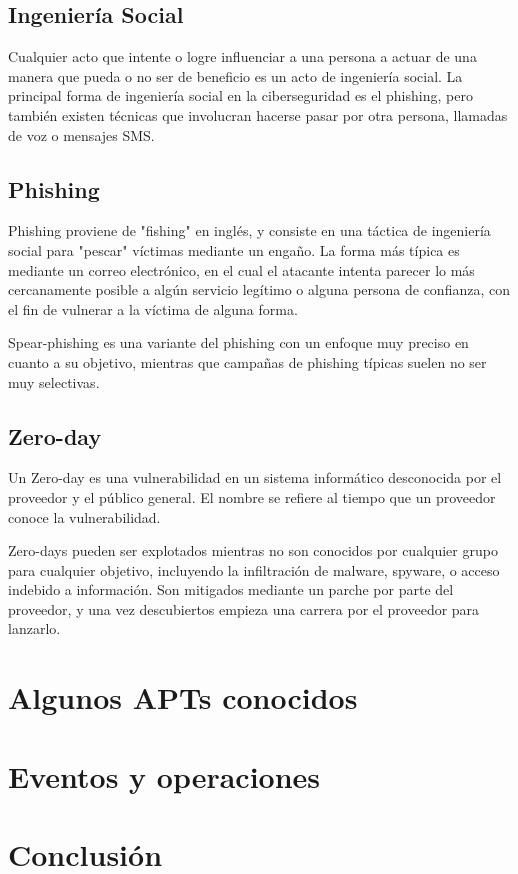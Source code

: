 \documentclass{article}
\begin{document}
\subsection{Ingeniería Social}
Cualquier acto que intente o logre influenciar a una persona a actuar de una manera que pueda o no ser de beneficio es un acto de ingeniería social. La principal forma de ingeniería social en la ciberseguridad es el phishing, pero también existen técnicas que involucran hacerse pasar por otra persona, llamadas de voz o mensajes SMS.

\subsection{Phishing}
Phishing proviene de "fishing" en inglés, y consiste en una táctica de ingeniería social para "pescar" víctimas mediante un engaño. La forma más típica es mediante un correo electrónico, en el cual el atacante intenta parecer lo más cercanamente posible a algún servicio legítimo o alguna persona de confianza, con el fin de vulnerar a la víctima de alguna forma.

Spear-phishing es una variante del phishing con un enfoque muy preciso en cuanto a su objetivo, mientras que campañas de phishing típicas suelen no ser muy selectivas.

\subsection{Zero-day}
Un Zero-day es una vulnerabilidad en un sistema informático desconocida por el proveedor y el público general. El nombre se refiere al tiempo que un proveedor conoce la vulnerabilidad.

Zero-days pueden ser explotados mientras no son conocidos por cualquier grupo para cualquier objetivo, incluyendo la infiltración de malware, spyware, o acceso indebido a información. Son mitigados mediante un parche por parte del proveedor, y una vez descubiertos empieza una carrera por el proveedor para lanzarlo.


\section{Algunos APTs conocidos}

\section{Eventos y operaciones}

\section{Conclusión}
\end{document}
